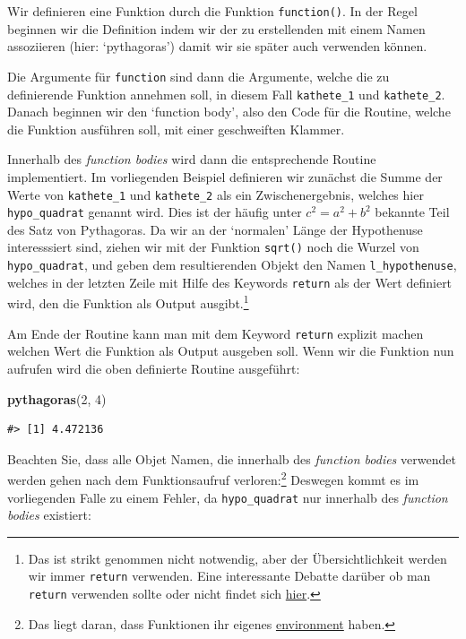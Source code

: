 \documentclass[]{book}
\newenvironment{Shaded}{\begin{snugshade}}{\end{snugshade}}
\newcommand{\KeywordTok}[1]{\textcolor[rgb]{0.13,0.29,0.53}{\textbf{#1}}}
\newcommand{\DecValTok}[1]{\textcolor[rgb]{0.00,0.00,0.81}{#1}}
\newcommand{\NormalTok}[1]{#1}
\let\rmarkdownfootnote\footnote%
\def\footnote{\protect\rmarkdownfootnote}
\begin{document}
Wir definieren eine Funktion durch die Funktion \texttt{function()}. In
der Regel beginnen wir die Definition indem wir der zu erstellenden mit
einem Namen assoziieren (hier: `pythagoras') damit wir sie später auch
verwenden können.

Die Argumente für \texttt{function} sind dann die Argumente, welche die
zu definierende Funktion annehmen soll, in diesem Fall
\texttt{kathete\_1} und \texttt{kathete\_2}. Danach beginnen wir den
`function body', also den Code für die Routine, welche die Funktion
ausführen soll, mit einer geschweiften Klammer.

Innerhalb des \emph{function bodies} wird dann die entsprechende Routine
implementiert. Im vorliegenden Beispiel definieren wir zunächst die
Summe der Werte von \texttt{kathete\_1} und \texttt{kathete\_2} als ein
Zwischenergebnis, welches hier \texttt{hypo\_quadrat} genannt wird. Dies
ist der häufig unter \(c^2=a^2 + b^2\) bekannte Teil des Satz von
Pythagoras. Da wir an der `normalen' Länge der Hypothenuse interesssiert
sind, ziehen wir mit der Funktion \texttt{sqrt()} noch die Wurzel von
\texttt{hypo\_quadrat}, und geben dem resultierenden Objekt den Namen
\texttt{l\_hypothenuse}, welches in der letzten Zeile mit Hilfe des
Keywords \texttt{return} als der Wert definiert wird, den die Funktion
als Output ausgibt.\footnote{Das ist strikt genommen nicht notwendig,
  aber der Übersichtlichkeit werden wir immer \texttt{return} verwenden.
  Eine interessante Debatte darüber ob man \texttt{return} verwenden
  sollte oder nicht findet sich
  \href{https://stackoverflow.com/questions/11738823/explicitly-calling-return-in-a-function-or-not}{hier}.}

Am Ende der Routine kann man mit dem Keyword \texttt{return} explizit
machen welchen Wert die Funktion als Output ausgeben soll. Wenn wir die
Funktion nun aufrufen wird die oben definierte Routine ausgeführt:

\begin{Shaded}
\begin{Highlighting}[]
\KeywordTok{pythagoras}\NormalTok{(}\DecValTok{2}\NormalTok{, }\DecValTok{4}\NormalTok{)}
\end{Highlighting}
\end{Shaded}

\begin{verbatim}
#> [1] 4.472136
\end{verbatim}

Beachten Sie, dass alle Objet Namen, die innerhalb des \emph{function
bodies} verwendet werden gehen nach dem Funktionsaufruf
verloren:\footnote{Das liegt daran, dass Funktionen ihr eigenes
  \href{https://adv-r.hadley.nz/environments.html}{environment} haben.}
Deswegen kommt es im vorliegenden Falle zu einem Fehler, da
\texttt{hypo\_quadrat} nur innerhalb des \emph{function bodies}
existiert:
\end{document}
